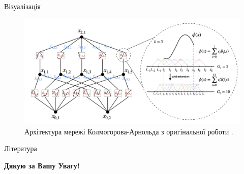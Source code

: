 \documentclass{zkdl-presentation-template}
\begin{document}
    \begin{frame}{Візуалізація}
        \begin{figure}
            \includegraphics[width=\textwidth]{images/kan.png}
            \caption{Архітектура мережі Колмогорова-Арнольда з оригінальної роботи \cite{kan}.}
        \end{figure}
    \end{frame}


    \begin{frame}[allowframebreaks]{Література}
        \printbibliography
    \end{frame}

    \begin{frame}
      \centering
      \LARGE
      \textbf{Дякую за Вашу Увагу!} \\
      
      \vspace{0.2cm} \Huge {} \large \\
    \end{frame}
\end{document}
